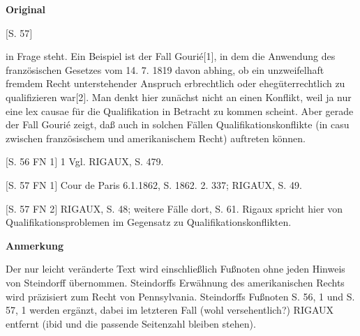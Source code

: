 \documentclass[ngerman,final,fontsize=12pt,paper=a4,twoside,bibliography=totocnumbered,BCOR=8mm,draft=false]{scrartcl}
\newenvironment{fragment}
	{\begin{snugshade}}
	{\end{snugshade}
	 \penalty-200
	 \vskip 0pt plus 10mm minus 5mm}
\newenvironment{fragmentpart}[1]
	{\noindent\textbf{#1}\par\penalty500}
	{\par}
\begin{document}
\begin{fragment}
\begin{fragmentpart}{Original \cite[S.~55--57 Z.~28--29,~1--4,~32--34,~1--8]{Steindorff-1958}}
{$[$S. 57$]$

in Frage steht. Ein Beispiel ist der Fall Gourié$[$1$]$, in dem die Anwendung des französischen Gesetzes vom 14. 7. 1819 davon abhing, ob ein unzweifelhaft fremdem Recht unterstehender Anspruch erbrechtlich oder ehegüterrechtlich zu qualifizieren war$[$2$]$. Man denkt hier zunächst nicht an einen Konflikt, weil ja nur eine lex causae für die Qualifikation in Betracht zu kommen scheint. Aber gerade der Fall Gourié zeigt, daß auch in solchen Fällen Qualifikationskonflikte (in casu zwischen französischem und amerikanischem Recht) auftreten können.

$[$S. 56 FN 1$]$ 1 Vgl. RIGAUX, S. 479.

$[$S. 57 FN 1$]$ Cour de Paris 6.1.1862, S. 1862. 2. 337; RIGAUX, S. 49.

$[$S. 57 FN 2$]$ RIGAUX, S. 48; weitere Fälle dort, S. 61. Rigaux spricht hier von Qualifikationsproblemen im Gegensatz zu Qualifikationskonflikten.}
\end{fragmentpart}
\begin{fragmentpart}{Anmerkung}
Der nur leicht veränderte Text wird einschließlich Fußnoten ohne jeden Hinweis von Steindorff übernommen. Steindorffs Erwähnung des amerikanischen Rechts wird präzisiert zum Recht von Pennsylvania. Steindorffs Fußnoten S. 56, 1 und S. 57, 1 werden ergänzt, dabei im letzteren Fall (wohl versehentlich?) RIGAUX entfernt (\textquotedbl{}ibid\textquotedbl{} und die passende Seitenzahl bleiben stehen).
\end{fragmentpart}
\end{fragment}
\hypertarget{Lm-Fragment-094-01}{}
\end{document}
